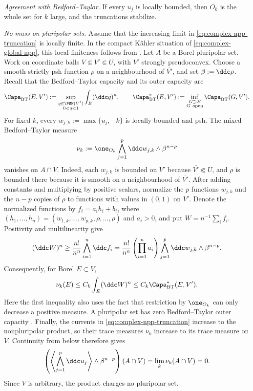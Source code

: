 \emph{Agreement with Bedford--Taylor.}  If every \(u_j\) is locally
bounded, then \(O_k\) is the whole set for \(k\) large, and the
truncations stabilize.

\emph{No mass on pluripolar sets.}  Assume that the increasing limit in
\eqref{eq:complex-npp-truncation} is locally finite.  In the compact K\"ahler
situation of \eqref{eq:complex-global-npp}, this local finiteness follows from
\cite[Proposition~1.6]{BEGZ10}.  Let \(A\) be a Borel pluripolar set.  Work
on coordinate balls \(V\Subset V'\Subset U\), with \(V'\) strongly
pseudoconvex.  Choose a smooth strictly psh function \(\rho\) on a
neighbourhood of \(\overline{V'}\), and set \(\beta:=\ddc\rho\).  Recall
that the Bedford--Taylor capacity and its outer capacity are
\[
 \Capa_{\mathrm{BT}}(E,V')
 :=\sup_{\substack{q\in\PSH(V')\\0<q<1}}
       \int_E(\ddc q)^n,
 \qquad
 \Capa_{\mathrm{BT}}^*(E,V')
 :=\inf_{\substack{G\supset E\\G\ \mathrm{open}}}
       \Capa_{\mathrm{BT}}(G,V').
\]
For fixed \(k\), every
\(w_{j,k}:=\max\{u_j,-k\}\) is locally bounded and psh.  The mixed
Bedford--Taylor measure
\[
 \nu_k:=\one_{O_k}\bigwedge_{j=1}^p\ddc w_{j,k}
                   \wedge\beta^{n-p}
\]
vanishes on \(A\cap V\).  Indeed, each \(w_{j,k}\) is bounded on \(V'\)
because \(\overline{V'}\Subset U\), and \(\rho\) is bounded there because
it is smooth on a neighbourhood of \(\overline{V'}\).  After adding
constants and multiplying by positive scalars, normalize the \(p\) functions
\(w_{j,k}\) and the \(n-p\) copies of \(\rho\) to functions with values in
\((0,1)\) on \(V'\).  Denote the normalized functions by
\(f_i=a_i h_i+b_i\), where
\((h_1,\ldots,h_n)=(w_{1,k},\ldots,w_{p,k},\rho,\ldots,\rho)\) and
\(a_i>0\), and put \(W=n^{-1}\sum_i f_i\).  Positivity and
multilinearity give
\[
 (\ddc W)^n\geq\frac{n!}{n^n}\bigwedge_{i=1}^n\ddc f_i
 =\frac{n!}{n^n}\left(\prod_{i=1}^na_i\right)
   \bigwedge_{j=1}^p\ddc w_{j,k}\wedge\beta^{n-p}.
\]
Consequently, for Borel \(E\subset V\),
\[
 \nu_k(E)\leq C_k\int_E(\ddc W)^n
             \leq C_k\Capa_{\mathrm{BT}}^*(E,V').
\]
Here the first inequality also uses the fact that restriction by
\(\one_{O_k}\) can only decrease a positive measure.  A pluripolar set has
zero Bedford--Taylor outer capacity
\cite[Theorem~6.9]{BT82}.  Finally, the currents in
\eqref{eq:complex-npp-truncation} increase to the nonpluripolar product, so
their trace measures \(\nu_k\) increase to its trace measure on \(V\).
Continuity from below therefore gives
\[
 \left(\left\langle\bigwedge_{j=1}^p\ddc u_j\right\rangle
       \wedge\beta^{n-p}\right)(A\cap V)
 =\lim_k\nu_k(A\cap V)=0.
\]
Since \(V\) is arbitrary, the product charges no pluripolar set.

